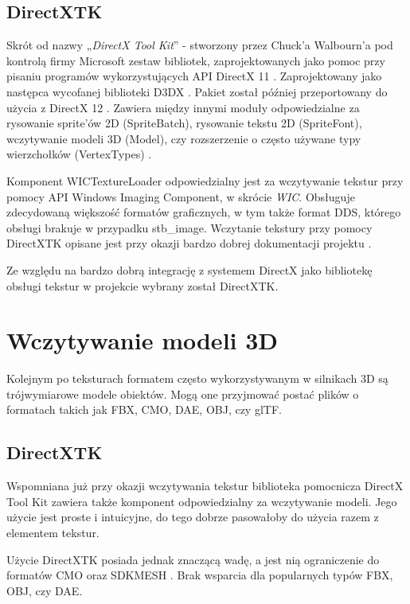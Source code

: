 \subsection{DirectXTK}

Skrót od nazwy „\emph{DirectX Tool Kit}'' - stworzony przez Chuck'a
Walbourn'a pod kontrolą firmy Microsoft zestaw bibliotek,
zaprojektowanych jako pomoc przy pisaniu programów wykorzystujących API
DirectX 11 \cite{github:directxtk:2024}. Zaprojektowany jako następca wycofanej biblioteki
D3DX \cite{walbourn:directxtk:2024}. Pakiet został później przeportowany do użycia z DirectX
12 \cite{github:directxtk12:2024}. Zawiera między innymi moduły odpowiedzialne za rysowanie
sprite'ów 2D (SpriteBatch), rysowanie tekstu 2D (SpriteFont),
wczytywanie modeli 3D (Model), czy rozszerzenie o często używane typy
wierzchołków (VertexTypes) \cite{walbourn:directxtk:2024}.

Komponent WICTextureLoader odpowiedzialny jest za wczytywanie tekstur
przy pomocy API Windows Imaging Component, w skrócie \emph{WIC}. Obsługuje zdecydowaną większość formatów graficznych, w tym także format
DDS, którego obsługi brakuje w przypadku stb\_image. Wczytanie tekstury przy pomocy DirectXTK opisane jest przy okazji bardzo
dobrej dokumentacji projektu \cite{github:directxtk:sprites:2024}.

Ze względu na bardzo dobrą integrację z systemem DirectX jako bibliotekę
obsługi tekstur w projekcie wybrany został DirectXTK.

\section{Wczytywanie modeli 3D}

Kolejnym po teksturach formatem często wykorzystywanym w silnikach 3D są
trójwymiarowe modele obiektów. Mogą one przyjmować postać plików o
formatach takich jak FBX, CMO, DAE, OBJ, czy glTF.

\subsection{DirectXTK}

Wspomniana już przy okazji wczytywania tekstur biblioteka pomocnicza
DirectX Tool Kit zawiera także komponent odpowiedzialny za wczytywanie
modeli. Jego użycie jest proste i intuicyjne, do tego dobrze pasowałoby
do użycia razem z elementem tekstur.

Użycie DirectXTK posiada jednak znaczącą wadę, a jest nią ograniczenie
do formatów CMO oraz SDKMESH \cite{github:directxtk:model:2024}. Brak wsparcia dla popularnych
typów FBX, OBJ, czy DAE.

